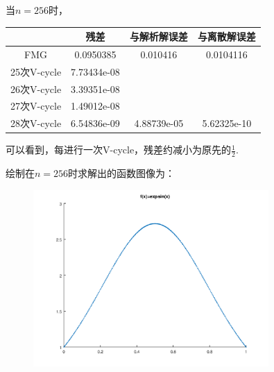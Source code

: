 \documentclass[a4paper,11.5pt,UTF8]{ctexart}
\begin{document}
\begin{large}
\begin{center}
\end{center}
当$n=256$时，
\begin{center}
	\begin{tabular}{|c|c|c|c|}
		\hline
		& 残差 & 与解析解误差 & 与离散解误差 \\
		\hline
		FMG & 0.0950385 & 0.010416 & 0.0104116 \\
		\hline
		25次V-cycle & 7.73434e-08 & ~ & ~ \\
		\hline
		26次V-cycle & 3.39351e-08 & ~ & ~ \\
		\hline
		27次V-cycle & 1.49012e-08 & ~ & ~ \\
		\hline
		28次V-cycle & 6.54836e-09 & 4.88739e-05 & 5.62325e-10 \\
		\hline
	\end{tabular}
\end{center}
可以看到，每进行一次V-cycle，残差约减小为原先的$\frac{1}{2}$.
\par 绘制在$n=256$时求解出的函数图像为：
\begin{figure}[H]
	\centering
	\includegraphics[width=0.8\textwidth,height=0.6\textwidth]{../output/figure/dim1_1.png}
\end{figure}


\end{large}
\end{document}
